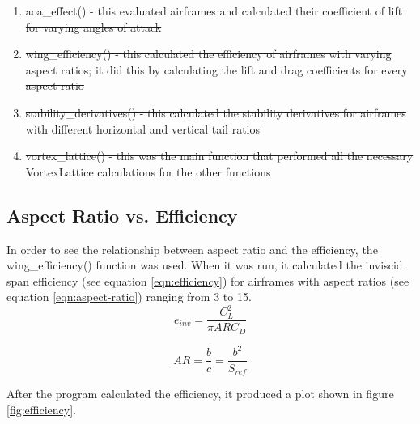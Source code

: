 \documentclass{journal}
\providecommand{\DIFdel}[1]{{\protect\color{red}\sout{#1}}}                      %
\providecommand{\DIFdelbegin}{} %
\providecommand{\DIFdelend}{} %
\newcommand{\DIFscaledelfig}{0.5}
\newlength{\DIFdelgraphicswidth} %
\newlength{\DIFdelgraphicsheight} %
\newcommand{\DIFdelincludegraphics}[2][]{%
\sbox{\DIFdelgraphicsbox}{\DIFOincludegraphics[#1]{#2}}%
\settoboxwidth{\DIFdelgraphicswidth}{\DIFdelgraphicsbox} %
\settoboxtotalheight{\DIFdelgraphicsheight}{\DIFdelgraphicsbox} %
\scalebox{\DIFscaledelfig}{%
\parbox[b]{\DIFdelgraphicswidth}{\usebox{\DIFdelgraphicsbox}\\[-\baselineskip] \rule{\DIFdelgraphicswidth}{0em}}\llap{\resizebox{\DIFdelgraphicswidth}{\DIFdelgraphicsheight}{%
\setlength{\unitlength}{\DIFdelgraphicswidth}%
\begin{picture}(1,1)%
\thicklines\linethickness{2pt} %
{\color[rgb]{1,0,0}\put(0,0){\framebox(1,1){}}}%
{\color[rgb]{1,0,0}\put(0,0){\line( 1,1){1}}}%
{\color[rgb]{1,0,0}\put(0,1){\line(1,-1){1}}}%
\end{picture}%
}\hspace*{3pt}}} %
} %
\DeclareRobustCommand{\DIFdelbegin}{\DIFOdelbegin \let\includegraphics\DIFdelincludegraphics} %
\DeclareRobustCommand{\DIFdelend}{\DIFOaddend \let\includegraphics\DIFOincludegraphics} %
\begin{document}
	\DIFdelbegin %
\begin{enumerate}%
\item%
\DIFdel{aoa\_effect() - this evaluated airframes and calculated their coefficient of lift for varying angles of attack 
		}%
\item%
\DIFdel{wing\_efficiency() - this calculated the efficiency of airframes with varying aspect ratios; it did this by calculating the lift and drag coefficients for every aspect ratio
		}%
\item%
\DIFdel{stability\_derivatives() - this calculated the stability derivatives for airframes with different horizontal and vertical tail ratios
		}%
\item%
\DIFdel{vortex\_lattice() - this was the main function that performed all the necessary VortexLattice calculations for the other functions 
	}
\end{enumerate}%

\DIFdelend \subsection{Aspect Ratio vs. Efficiency}

	In order to see the relationship between aspect ratio and the efficiency, the wing\_efficiency() function was used. When it was run, it calculated the inviscid span efficiency (see equation \ref{eqn:efficiency}) for airframes with aspect ratios (see equation \ref{eqn:aspect-ratio}) ranging from 3 to 15.\\

	\begin{equation}
		e_{inv} = \frac{C_L^2}{\pi{ARC_D}}
		\label{eqn:efficiency}
	\end{equation}

	\begin{equation}
		AR = \frac{b}{c} = \frac{b^2}{S_{ref}}
		\label{eqn:aspect-ratio}
	\end{equation}

	After the program calculated the efficiency, it produced a plot shown in figure \ref{fig:efficiency}.\\
\end{document}
